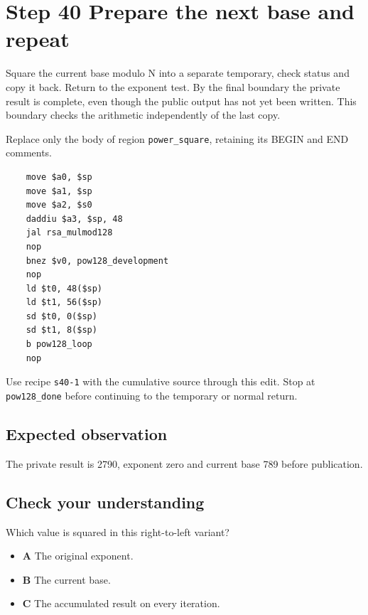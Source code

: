 \section{Step 40 Prepare the next base and repeat}\label{rsa-s40}

Square the current base modulo N into a separate temporary, check status and copy it back. Return to the exponent test. By the final boundary the private result is complete, even though the public output has not yet been written. This boundary checks the arithmetic independently of the last copy.

Replace only the body of region \texttt{power\_square}, retaining its BEGIN and END comments.

\begin{verbatim}
    move $a0, $sp
    move $a1, $sp
    move $a2, $s0
    daddiu $a3, $sp, 48
    jal rsa_mulmod128
    nop
    bnez $v0, pow128_development
    nop
    ld $t0, 48($sp)
    ld $t1, 56($sp)
    sd $t0, 0($sp)
    sd $t1, 8($sp)
    b pow128_loop
    nop
\end{verbatim}

Use recipe \texttt{s40-1} with the cumulative source through this edit. Stop at \texttt{pow128\_done} before continuing to the temporary or normal return.

\subsection{Expected observation}
The private result is 2790, exponent zero and current base 789 before publication.

\subsection{Check your understanding}
Which value is squared in this right-to-left variant?

\begin{itemize}
  \item \textbf{A} The original exponent.
  \item \textbf{B} The current base.
  \item \textbf{C} The accumulated result on every iteration.
\end{itemize}
